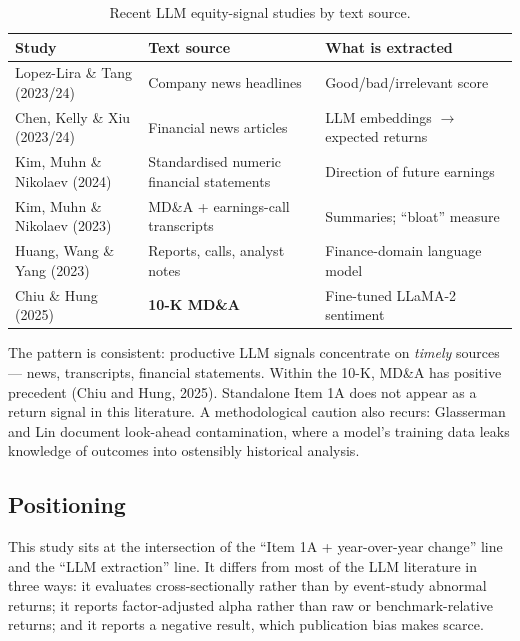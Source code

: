 \documentclass[11pt]{article}
\begin{document}
\begin{table}[H]
\centering\small
\caption{Recent LLM equity-signal studies by text source.}
\label{tab:lit}
\setlength{\tabcolsep}{4pt}\footnotesize
\begin{tabular}{p{4.3cm} p{4.3cm} p{4.5cm}}
\toprule
\textbf{Study} & \textbf{Text source} & \textbf{What is extracted} \\
\midrule
Lopez-Lira \& Tang (2023/24) & Company news headlines & Good/bad/irrelevant score \\
Chen, Kelly \& Xiu (2023/24) & Financial news articles & LLM embeddings $\rightarrow$ expected returns \\
Kim, Muhn \& Nikolaev (2024) & Standardised numeric financial statements & Direction of future earnings \\
Kim, Muhn \& Nikolaev (2023) & MD\&A + earnings-call transcripts & Summaries; ``bloat'' measure \\
Huang, Wang \& Yang (2023) & Reports, calls, analyst notes & Finance-domain language model \\
Chiu \& Hung (2025) & \textbf{10-K MD\&A} & Fine-tuned LLaMA-2 sentiment \\
\bottomrule
\end{tabular}
\end{table}

The pattern is consistent: productive LLM signals concentrate on \emph{timely} sources---
news, transcripts, financial statements. Within the 10-K, MD\&A has positive precedent
(Chiu and Hung, 2025). Standalone Item 1A does not appear as a return signal in this
literature. A methodological caution also recurs: Glasserman and Lin document look-ahead
contamination, where a model's training data leaks knowledge of outcomes into
ostensibly historical analysis.

\subsection{Positioning}

This study sits at the intersection of the ``Item 1A + year-over-year change'' line and
the ``LLM extraction'' line. It differs from most of the LLM literature in three ways: it
evaluates cross-sectionally rather than by event-study abnormal returns; it reports
factor-adjusted alpha rather than raw or benchmark-relative returns; and it reports a
negative result, which publication bias makes scarce.

\end{document}
